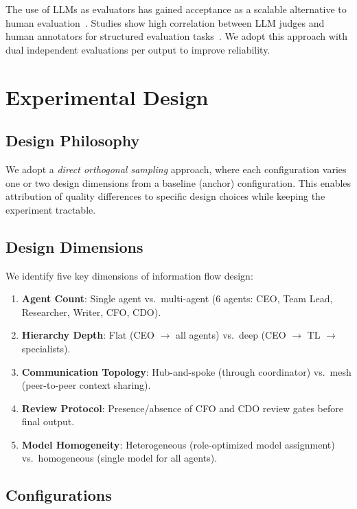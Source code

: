 \documentclass[conference]{IEEEtran}
\begin{document}
The use of LLMs as evaluators has gained acceptance as a scalable alternative to human evaluation~\cite{zheng2023judging}.
Studies show high correlation between LLM judges and human annotators for structured evaluation tasks~\cite{liu2023geval}.
We adopt this approach with dual independent evaluations per output to improve reliability.

\section{Experimental Design}
\label{sec:design}

\subsection{Design Philosophy}

We adopt a \emph{direct orthogonal sampling} approach, where each configuration varies one or two design dimensions from a baseline (anchor) configuration.
This enables attribution of quality differences to specific design choices while keeping the experiment tractable.

\subsection{Design Dimensions}

We identify five key dimensions of information flow design:

\begin{enumerate}
    \item \textbf{Agent Count}: Single agent vs.\ multi-agent (6 agents: CEO, Team Lead, Researcher, Writer, CFO, CDO).
    \item \textbf{Hierarchy Depth}: Flat (CEO $\rightarrow$ all agents) vs.\ deep (CEO $\rightarrow$ TL $\rightarrow$ specialists).
    \item \textbf{Communication Topology}: Hub-and-spoke (through coordinator) vs.\ mesh (peer-to-peer context sharing).
    \item \textbf{Review Protocol}: Presence/absence of CFO and CDO review gates before final output.
    \item \textbf{Model Homogeneity}: Heterogeneous (role-optimized model assignment) vs.\ homogeneous (single model for all agents).
\end{enumerate}

\subsection{Configurations}
\label{subsec:configs}
\end{document}
